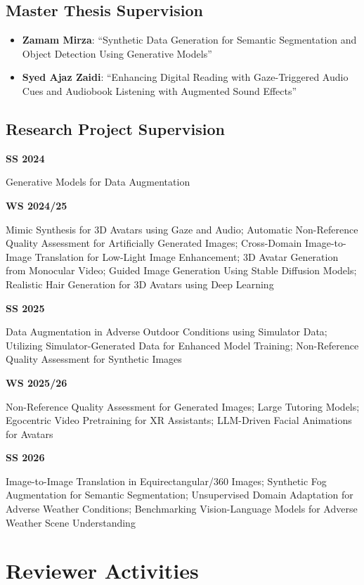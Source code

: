 \documentclass[11pt,a4paper]{article}
\newcommand{\cvline}[2]{%
  \par\noindent
  \begin{minipage}[t]{3.5cm}\raggedright\textbf{#1}\end{minipage}%
  \hfill
  \begin{minipage}[t]{\dimexpr\textwidth-3.8cm\relax}#2\end{minipage}%
  \par\vspace{4pt}%
}
\begin{document}
\subsection*{Master Thesis Supervision}

\begin{itemize}[nosep, leftmargin=1.5em, itemsep=3pt]
  \item \textbf{Zamam Mirza}: ``Synthetic Data Generation for Semantic
    Segmentation and Object Detection Using Generative Models''
  \item \textbf{Syed Ajaz Zaidi}: ``Enhancing Digital Reading with
    Gaze-Triggered Audio Cues and Audiobook Listening with Augmented Sound Effects''
\end{itemize}

\subsection*{Research Project Supervision}

\cvline{SS 2024}{%
  Generative Models for Data Augmentation}

\cvline{WS 2024/25}{%
  Mimic Synthesis for 3D Avatars using Gaze and Audio;
  Automatic Non-Reference Quality Assessment for Artificially Generated Images;
  Cross-Domain Image-to-Image Translation for Low-Light Image Enhancement;
  3D Avatar Generation from Monocular Video;
  Guided Image Generation Using Stable Diffusion Models;
  Realistic Hair Generation for 3D Avatars using Deep Learning}

\cvline{SS 2025}{%
  Data Augmentation in Adverse Outdoor Conditions using Simulator Data;
  Utilizing Simulator-Generated Data for Enhanced Model Training;
  Non-Reference Quality Assessment for Synthetic Images}

\cvline{WS 2025/26}{%
  Non-Reference Quality Assessment for Generated Images;
  Large Tutoring Models;
  Egocentric Video Pretraining for XR Assistants;
  LLM-Driven Facial Animations for Avatars}

\cvline{SS 2026}{%
  Image-to-Image Translation in Equirectangular/360\textdegree{} Images;
  Synthetic Fog Augmentation for Semantic Segmentation;
  Unsupervised Domain Adaptation for Adverse Weather Conditions;
  Benchmarking Vision-Language Models for Adverse Weather Scene Understanding}

\section*{Reviewer Activities}
\end{document}
